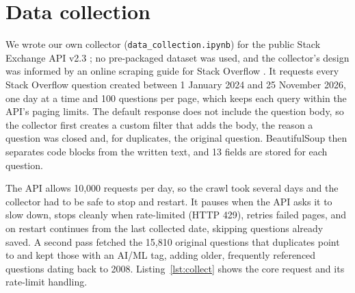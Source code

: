 \section{Data collection}

We wrote our own collector (\texttt{data\_collection.ipynb}) for the public Stack Exchange API v2.3
\cite{seapi}; no pre-packaged dataset was used, and the collector's design was informed by an online
scraping guide for Stack Overflow \cite{linksc}. It requests every Stack Overflow question created between
1 January 2024 and 25 November 2026, one day at a time and 100 questions per page, which keeps each query
within the API's paging limits. The default response does not include the question body, so the
collector first creates a custom filter that adds the body, the reason a question was closed and, for
duplicates, the original question. BeautifulSoup then separates code blocks from the written text, and
13 fields are stored for each question.


The API allows 10,000 requests per day, so the crawl took several days and the collector had to be safe
to stop and restart. It pauses when the API asks it to slow down, stops cleanly when rate-limited (HTTP
429), retries failed pages, and on restart continues from the last collected date, skipping questions
already saved. A second pass fetched the 15,810 original questions that duplicates point to and kept
those with an AI/ML tag, adding older, frequently referenced questions dating back to 2008. Listing~\ref{lst:collect} shows the core request and its rate-limit handling.


